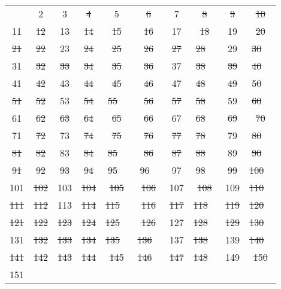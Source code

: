 \documentclass[german,12pt,a4paper]{article}
\begin{document}
\begin{center}\begin{tabular}{|c|c|c|c|c|c|c|c|c|c|}
\hline
   & 2 & 3 & \st{ 4 } & 5 & \st{ 6 } & 7 & \st{ 8 } & \st{ 9 } & \st{ 10 } \\
11 & \st{ 12 } & 13 & \st{ 14 } & \st{ 15 } & \st{ 16 } & 17 & \st{ 18 } & 19 & \st{ 20 } \\
\st{ 21 } & \st{ 22 } & 23 & \st{ 24 } & \st{ 25 } & \st{ 26 } & \st{ 27 } & \st{ 28 } & 29 & \st{ 30 } \\
31 & \st{ 32 } & \st{ 33 } & \st{ 34 } & \st{ 35 } & \st{ 36 } & 37 & \st{ 38 } & \st{ 39 } & \st{ 40 } \\
41 & \st{ 42 } & 43 & \st{ 44 } & \st{ 45 } & \st{ 46 } & 47 & \st{ 48 } & \st{ 49 } & \st{ 50 } \\
\st{ 51 } & \st{ 52 } & 53 & \st{ 54 } & \st{ 55 } & \st{ 56 } & \st{ 57 } & \st{ 58 } & 59 & \st{ 60 } \\
61 & \st{ 62 } & \st{ 63 } & \st{ 64 } & \st{ 65 } & \st{ 66 } & 67 & \st{ 68 } & \st{ 69 } & \st{ 70 } \\
71 & \st{ 72 } & 73 & \st{ 74 } & \st{ 75 } & \st{ 76 } & \st{ 77 } & \st{ 78 } & 79 & \st{ 80 } \\
\st{ 81 } & \st{ 82 } & 83 & \st{ 84 } & \st{ 85 } & \st{ 86 } & \st{ 87 } & \st{ 88 } & 89 & \st{ 90 } \\
\st{ 91 } & \st{ 92 } & \st{ 93 } & \st{ 94 } & \st{ 95 } & \st{ 96 } & 97 & \st{ 98 } & \st{ 99 } & \st{ 100 } \\
101 & \st{ 102 } & 103 & \st{ 104 } & \st{ 105 } & \st{ 106 } & 107 & \st{ 108 } & 109 & \st{ 110 } \\
\st{ 111 } & \st{ 112 } & 113 & \st{ 114 } & \st{ 115 } & \st{ 116 } & \st{ 117 } & \st{ 118 } & \st{ 119 } & \st{ 120 } \\
\st{ 121 } & \st{ 122 } & \st{ 123 } & \st{ 124 } & \st{ 125 } & \st{ 126 } & 127 & \st{ 128 } & \st{ 129 } & \st{ 130 } \\
131 & \st{ 132 } & \st{ 133 } & \st{ 134 } & \st{ 135 } & \st{ 136 } & 137 & \st{ 138 } & 139 & \st{ 140 } \\
\st{ 141 } & \st{ 142 } & \st{ 143 } & \st{ 144 } & \st{ 145 } & \st{ 146 } & \st{ 147 } & \st{ 148 } & 149 & \st{ 150 } \\
151 & & & & & & & & & \\
\hline
\end{tabular}\end{center}
\end{document}
